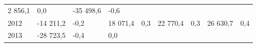 \begin{longtable}[]{@{}lllllllll@{}}
\begin{minipage}[t]{0.12\columnwidth}
2 856,1\strut
\end{minipage} & \begin{minipage}[t]{0.06\columnwidth}\raggedright
0,0\strut
\end{minipage} & \begin{minipage}[t]{0.08\columnwidth}\raggedright
-35 498,6\strut
\end{minipage} & \begin{minipage}[t]{0.06\columnwidth}\raggedright
-0,6\strut
\end{minipage}\tabularnewline
\begin{minipage}[t]{0.05\columnwidth}\raggedright
2012\strut
\end{minipage} & \begin{minipage}[t]{0.10\columnwidth}\raggedright
-14 211,2\strut
\end{minipage} & \begin{minipage}[t]{0.06\columnwidth}\raggedright
-0,2\strut
\end{minipage} & \begin{minipage}[t]{0.17\columnwidth}\raggedright
18 071,4\strut
\end{minipage} & \begin{minipage}[t]{0.06\columnwidth}\raggedright
0,3\strut
\end{minipage} & \begin{minipage}[t]{0.12\columnwidth}\raggedright
22 770,4\strut
\end{minipage} & \begin{minipage}[t]{0.06\columnwidth}\raggedright
0,3\strut
\end{minipage} & \begin{minipage}[t]{0.08\columnwidth}\raggedright
26 630,7\strut
\end{minipage} & \begin{minipage}[t]{0.06\columnwidth}\raggedright
0,4\strut
\end{minipage}\tabularnewline
\begin{minipage}[t]{0.05\columnwidth}\raggedright
2013\strut
\end{minipage} & \begin{minipage}[t]{0.10\columnwidth}\raggedright
-28 723,5\strut
\end{minipage} & \begin{minipage}[t]{0.06\columnwidth}\raggedright
-0,4\strut
\end{minipage} & \begin{minipage}[t]{0.17\columnwidth}\raggedright
0,0\strut
\end{minipage} & \begin{minipage}[t]{0.06\columnwidth}\raggedright

\end{minipage}
\end{longtable}
